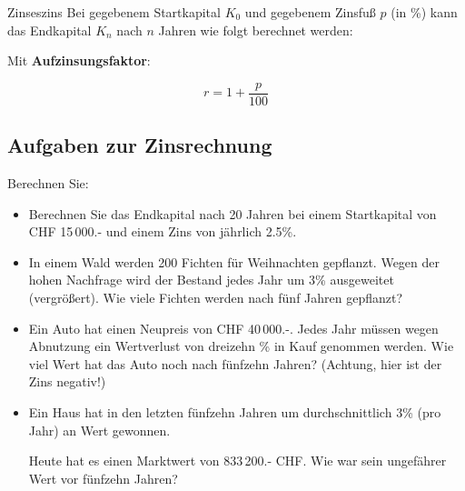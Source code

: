 \begin{gesetz}{Zinseszins}{}
Bei gegebenem Startkapital $K_0$ und gegebenem Zinsfuß $p$ (in \%) kann das Endkapital $K_n$ nach $n$ Jahren wie folgt berechnet werden:

\begin{center}\end{center}

Mit \textbf{Aufzinsungsfaktor}:

$$r = 1 + \frac{p}{100}$$
\end{gesetz}

\newpage

\subsection*{Aufgaben zur Zinsrechnung}

Berechnen Sie:

\begin{itemize}
  \item Berechnen Sie das Endkapital nach 20 Jahren bei einem
  Startkapital von CHF 15\,000.- und einem Zins von jährlich
  2.5\%.\\%

\item In einem Wald werden 200 Fichten für Weihnachten
  gepflanzt. Wegen der hohen Nachfrage wird der Bestand jedes Jahr um
  3\% ausgeweitet (vergrößert).
  Wie viele Fichten werden nach fünf Jahren gepflanzt?




\item Ein Auto hat einen Neupreis von CHF 40\,000.-. Jedes Jahr müssen
wegen Abnutzung ein Wertverlust von dreizehn \% in Kauf
  genommen werden. Wie viel Wert hat das Auto noch nach fünfzehn Jahren? (Achtung, hier ist der Zins negativ!)



\item Ein Haus hat in den letzten fünfzehn Jahren um durchschnittlich 3\% (pro Jahr) an Wert gewonnen.

Heute hat es einen Marktwert
  von 833\,200.- CHF. Wie  war sein ungefährer Wert vor fünfzehn Jahren?

\end{itemize}

